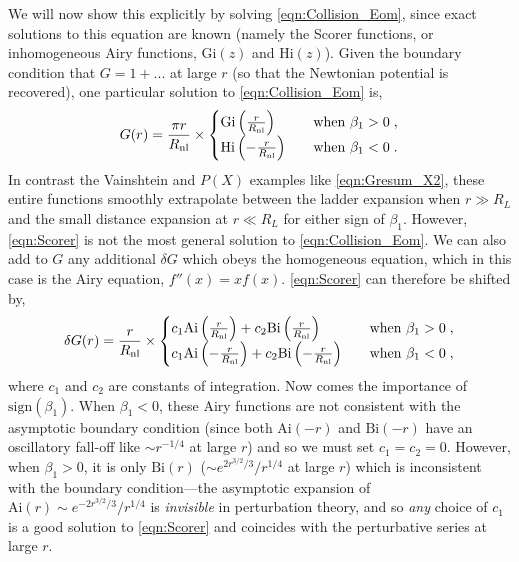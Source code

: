 \documentclass[11pt]{article}
\begin{document}
We will now show this explicitly by solving \eqref{eqn:Collision_Eom}, since exact solutions to this equation are known (namely the Scorer functions, or inhomogeneous Airy functions, $\text{Gi} (z)$ and $\text{Hi} (z)$). Given the boundary condition that $G = 1 + ...$ at large $r$ (so that the Newtonian potential is recovered), one particular solution to \eqref{eqn:Collision_Eom} is, 
\begin{align}
 G (r) =  \frac{\pi r}{R_{\rm nl} } \times  \begin{cases}
    \text{Gi} \left(  \frac{r}{R_{\rm nl} }   \right)  \quad &\text{when } \beta_1 > 0 \; ,  \\
   \text{Hi} \left( - \frac{r}{R_{\rm nl} }   \right)  \quad &\text{when } \beta_1 < 0 \; . 
   \end{cases}
   \label{eqn:Scorer}
\end{align}
In contrast the Vainshtein and $P(X)$ examples like \eqref{eqn:Gresum_X2}, these entire functions smoothly extrapolate between the ladder expansion when $r \gg R_L$ and the small distance expansion at $r \ll R_L$ for either sign of $\beta_1$. 
However, \eqref{eqn:Scorer} is not the most general solution to \eqref{eqn:Collision_Eom}. We can also add to $G$ any additional $\delta G$ which obeys the homogeneous equation, which in this case is the Airy equation, $f''(x)=x f(x) $. \eqref{eqn:Scorer} can therefore be shifted by,
\begin{align}
 \delta G  (r) = \frac{r}{R_{\rm nl} } \times \begin{cases}
 c_1 \text{Ai} \left( \frac{r}{R_{\rm nl} } \right) + c_2 \text{Bi} \left(  \frac{r}{R_{\rm nl}}  \right)  \quad &\text{when } \beta_1 > 0 \; , \\ 
 c_1 \text{Ai} \left( - \frac{r}{R_{\rm nl} } \right) + c_2 \text{Bi} \left( - \frac{r}{R_{\rm nl} }  \right)  \quad &\text{when } \beta_1 < 0 \;  ,   
 \end{cases}  
\end{align}
where $c_1$ and $c_2$ are constants of integration. 
Now comes the importance of $\text{sign} (\beta_1)$. When $\beta_1 < 0$, these Airy functions are not consistent with the asymptotic boundary condition (since both $\text{Ai} (-r)$ and $\text{Bi} (-r)$ have an oscillatory fall-off like $ \sim r^{-1/4}$ at large $r$) and so we must set $c_1 = c_2 = 0$. 
However, when $\beta_1 > 0$, it is only $\text{Bi} (r)$ ($\sim e^{2 r^{3/2}/3}/r^{1/4}$ at large $r$) which is inconsistent with the boundary condition---the asymptotic expansion of $\text{Ai} (r) \sim e^{-2r^{3/2}/3}/r^{1/4}$ is \emph{invisible} in perturbation theory, and so \emph{any} choice of $c_1$ is a good solution to \eqref{eqn:Scorer} and coincides with the perturbative series at large $r$. 
\end{document}
